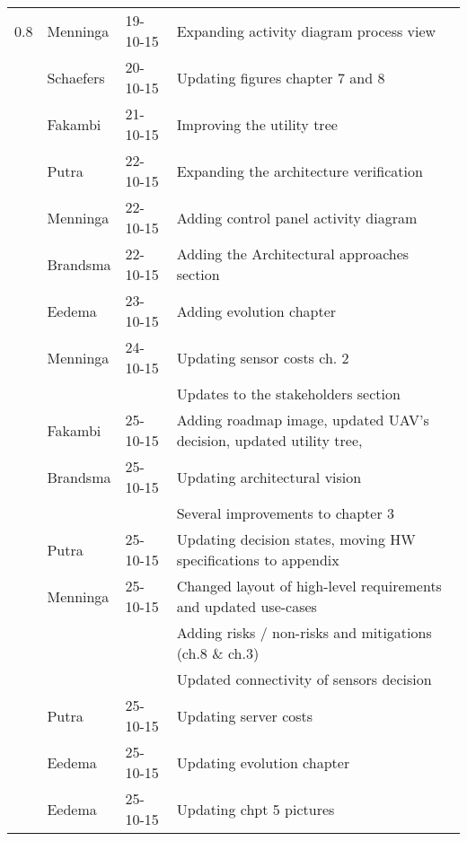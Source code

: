 \begin{longtable}{L{} L{} L{} L{}}
	\midrule                 
	0.8				& Menninga		& 19-10-15 & Expanding activity diagram process view \\
					& Schaefers     & 20-10-15 & Updating figures chapter 7 and 8 \\
					& Fakambi		& 21-10-15 & Improving the utility tree \\
					& Putra			& 22-10-15 & Expanding the architecture verification \\
					& Menninga		& 22-10-15 & Adding control panel activity diagram \\
					& Brandsma		& 22-10-15 & Adding the Architectural approaches section \\
					& Eedema		& 23-10-15 & Adding evolution chapter \\
					& Menninga		& 24-10-15 & Updating sensor costs ch. 2 \\
					&				&		   & Updates to the stakeholders section \\
					& Fakambi		& 25-10-15 & Adding roadmap image, updated UAV's decision, updated utility tree, \\
					& Brandsma		& 25-10-15 & Updating architectural vision \\
					&				&		   & Several improvements to chapter 3 \\
					& Putra			& 25-10-15 & Updating decision states, moving HW specifications to appendix \\
					& Menninga		& 25-10-15 & Changed layout of high-level requirements and updated use-cases \\
					&				&		   & Adding risks / non-risks and mitigations (ch.8 \& ch.3) \\
					& 				&		   & Updated connectivity of sensors decision \\
					& Putra			& 25-10-15 & Updating server costs \\
					& Eedema		& 25-10-15 & Updating evolution chapter \\
					& Eedema		& 25-10-15 & Updating chpt 5 pictures \\

	\bottomrule
\end{longtable}